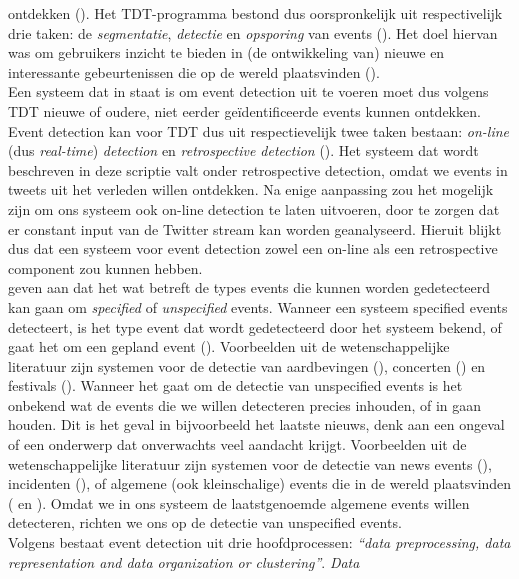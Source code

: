 \documentclass[a4paper,10pt,titlepage]{article}
\def\vl{\\[9pt]}                              %
\def\it{\textit}                              %
\begin{document}
ontdekken ({\citealt{allan2002introduction}). Het TDT-programma bestond dus oorspronkelijk uit 
respectivelijk drie taken: de \it{segmentatie}, \it{detectie} en \it{opsporing} van events 
(\citealt{atefeh2013survey}). Het doel hiervan was om gebruikers inzicht te bieden in (de 
ontwikkeling van) nieuwe en interessante gebeurtenissen die op de wereld 
plaatsvinden ({\citealt{allan2002introduction}).
\vl
Een systeem dat in staat is om event detection uit te voeren moet dus volgens 
TDT nieuwe of oudere, niet eerder ge\"identificeerde events kunnen ontdekken. 
Event detection kan voor TDT dus uit respectievelijk twee taken bestaan: \it{on-line} (dus 
\it{real-time}) \it{detection} en \it{retrospective detection} (\citealt{yang1998study}). Het systeem dat 
wordt beschreven in deze scriptie valt onder retrospective detection, 
omdat we events in tweets uit het verleden willen ontdekken. Na enige aanpassing 
zou het mogelijk zijn om ons systeem ook on-line detection te laten uitvoeren, door te 
zorgen dat er constant input van de Twitter stream kan worden geanalyseerd. 
Hieruit blijkt dus dat een systeem voor event detection zowel een on-line als een retrospective 
component zou kunnen hebben.
\vl
\citeauthor{atefeh2013survey} geven aan dat het wat betreft de types events die kunnen worden 
gedetecteerd kan gaan om \it{specified} of \it{unspecified} events. Wanneer een systeem 
specified events detecteert, is het type event dat wordt gedetecteerd door het 
systeem bekend, of gaat het om een gepland event (\citealt{atefeh2013survey}). Voorbeelden 
uit de wetenschappelijke literatuur zijn systemen voor de detectie van 
aardbevingen (\citealt{sakaki2010earthquake}), concerten (\citealt{benson2011event}) en festivals (\citealt{lee2010measuring}). 
Wanneer het gaat om de detectie van unspecified events is het onbekend wat 
de events die we willen detecteren precies inhouden, of in gaan houden. Dit is 
het geval in bijvoorbeeld het laatste nieuws, denk aan een ongeval 
of een onderwerp dat onverwachts veel aandacht krijgt. Voorbeelden uit de 
wetenschappelijke literatuur zijn systemen voor de detectie van news events
(\citealt{sankaranarayanan2009twitterstand}), incidenten (\citealt{abel2012twitcident}), of algemene (ook kleinschalige) events die in de wereld
plaatsvinden (\citealt{walther2013geo} en \citealt{becker2011beyond}). Omdat we in ons systeem de laatstgenoemde
algemene events willen detecteren, richten we ons op de detectie van unspecified
events.
\vl
Volgens \citeauthor{atefeh2013survey} bestaat event detection uit drie hoofdprocessen: \it{``data 
preprocessing, data representation and data organization or clustering''}. \it{Data 
}}}
\end{document}
